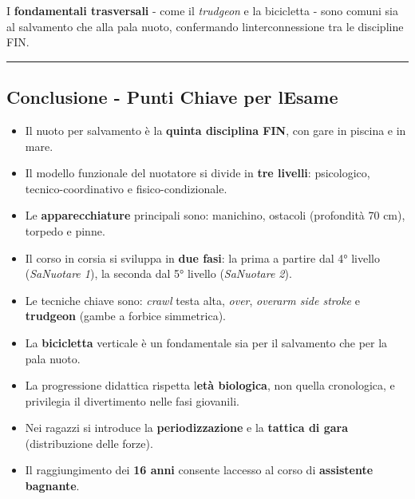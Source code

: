 \documentclass[a4paper,11pt]{article}
\providecommand{\tightlist}{%
  \setlength{\itemsep}{0pt}\setlength{\parskip}{0pt}}
\begin{document}
I \textbf{fondamentali trasversali} - come il \emph{trudgeon} e la
bicicletta - sono comuni sia al salvamento che alla pala nuoto,
confermando l\textquotesingle interconnessione tra le discipline FIN.

\begin{center}\rule{0.5\linewidth}{0.5pt}\end{center}

\subsection{Conclusione - Punti Chiave per
      l\textquotesingle Esame}\label{conclusione---punti-chiave-per-lesame-4}

\begin{itemize}
      \tightlist
      \item
            Il nuoto per salvamento è la \textbf{quinta disciplina FIN}, con gare
            in piscina e in mare.
      \item
            Il modello funzionale del nuotatore si divide in \textbf{tre livelli}:
            psicologico, tecnico-coordinativo e fisico-condizionale.
      \item
            Le \textbf{apparecchiature} principali sono: manichino, ostacoli
            (profondità 70 cm), torpedo e pinne.
      \item
            Il corso in corsia si sviluppa in \textbf{due fasi}: la prima a
            partire dal 4° livello (\emph{SaNuotare 1}), la seconda dal 5° livello
            (\emph{SaNuotare 2}).
      \item
            Le tecniche chiave sono: \emph{crawl} testa alta, \emph{over},
            \emph{overarm side stroke} e \textbf{trudgeon} (gambe a forbice
            simmetrica).
      \item
            La \textbf{bicicletta} verticale è un fondamentale sia per il
            salvamento che per la pala nuoto.
      \item
            La progressione didattica rispetta l\textquotesingle{}\textbf{età
                  biologica}, non quella cronologica, e privilegia il divertimento nelle
            fasi giovanili.
      \item
            Nei ragazzi si introduce la \textbf{periodizzazione} e la
            \textbf{tattica di gara} (distribuzione delle forze).
      \item
            Il raggiungimento dei \textbf{16 anni} consente
            l\textquotesingle accesso al corso di \textbf{assistente bagnante}.
\end{itemize}
\end{document}
